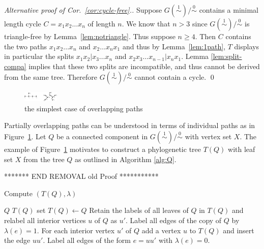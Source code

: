 \documentclass[smallextended]{svjour3}
\newcommand{\rev}[1]{\begingroup\color{blue}#1\endgroup}
\newcommand{\remove}[1]{\begingroup\tiny\color{yellow}#1\endgroup}
\newcommand{\Ro}{\mathrel{\overset{0}{\sim}}}
\newcommand{\Rl}{\mathrel{\overset{1}{\sim}}}
\begin{document}
{\begin{proof}[Alternative proof of Cor.\ \ref{cor:cycle-free}.]
  Suppose $G(\Rl)/\Ro$ contains a minimal length cycle $C=x_1x_2\dots x_n$
  of length $n$. We know that $n>3$ since $G(\Rl)/\Ro$ is triangle-free by
  Lemma~\ref{lem:notriangle}. Thus suppose $n\ge 4$. Then $C$ contains the
  two paths $x_1x_2\dots x_n$ and $x_2\dots x_nx_1$ and thus by
  Lemma~\ref{lem:1path}, $T$ displays in particular the splits
  $x_1x_2|x_3\dots x_n$ and $x_2x_3\dots x_{n-1}|x_n x_1$. Lemma
  \ref{lem:split-compa} implies that these two splits are incompatible,
  and thus cannot be derived from the same tree. Therefore $G(\Rl)/\Ro$ cannot
  contain a cycle.
\qed\end{proof}

\begin{figure}
\begin{center}
\includegraphics[width=0.15\textwidth]{quintuple2.eps}
\end{center}
\caption{\remove{the simplest case of overlapping paths}}
\label{fig:quint2}
\end{figure} 

Partially overlapping paths can be understood in terms of individual paths
as in Figure~\ref{fig:quint2}.  Let $Q$ be a connected component in
$G(\Rl)/\Ro$ with vertex set $X$.  The example of Figure~\ref{fig:quint2}
motivates to construct a \rev{phylogenetic tree $T(Q)$ with leaf set $X$}
from the tree $Q$ as outlined in Algorithm \ref{alg:Q}.

******* END REMOVAL old Proof *********** }

\begin{algorithm}
\caption{Compute $(T(Q), \lambda)$}
\label{alg:Q}
\begin{algorithmic}[1]
  \REQUIRE $Q$
  \ENSURE $T(Q)$
  \STATE set $T(Q)\leftarrow Q$ 
  \STATE Retain the labels of all leaves of $Q$ in $T(Q)$ and relabel 
			all interior vertices $u$ of $Q$ as $u'$.
  \STATE Label all edges of the copy of $Q$ by $\lambda(e)=1$.
  \STATE For each interior vertex $u'$ of $Q$ add a vertex $u$ to $T(Q)$ and 
		   insert the edge $uu'$. 
  \STATE Label all edges of the form $e=uu'$ with $\lambda(e)=0$. 
\end{algorithmic}
\end{algorithm}
\end{document}
